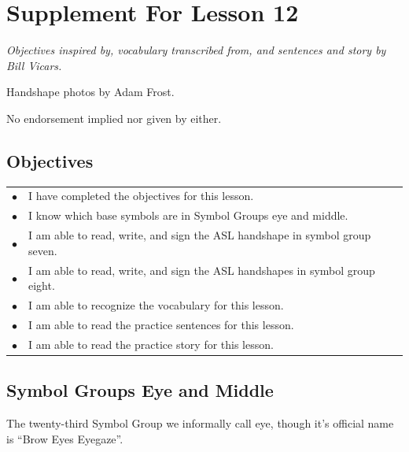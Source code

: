 \documentclass{article}
\begin{document}
\newfontfamily{}
\newfontfamily{}
\newcommand{\bul}{\hfil$\bullet$&}
\renewenvironment{glossary}{\begin{multicols}{5}\begin{center}}{\end{center}\end{multicols}}
\setcounter{secnumdepth}{0}
\setlength{\columnseprule}{1pt}

\section{Supplement For Lesson 12}

\begin{center}
\it
Objectives inspired by, vocabulary transcribed from, and sentences and story by Bill Vicars.

Handshape photos by Adam Frost.

No endorsement implied nor given by either.
\end{center}

\subsection{Objectives}

\begin{tabular}{p{1cm}p{14cm}}
\bul I have completed the objectives for this lesson.\\
\bul I know which base symbols are in Symbol Groups eye and middle.\\
\bul I am able to read, write, and sign the ASL handshape in symbol group seven.\\
\bul I am able to read, write, and sign the ASL handshapes in symbol group eight.\\
\bul I am able to recognize the vocabulary for this lesson.\\
\bul I am able to read the practice sentences for this lesson.\\
\bul I am able to read the practice story for this lesson.\\
\end{tabular}

\subsection{Symbol Groups Eye and Middle}

The twenty-third Symbol Group we informally call eye, though it's official name is ``Brow Eyes Eyegaze''.
\end{document}
